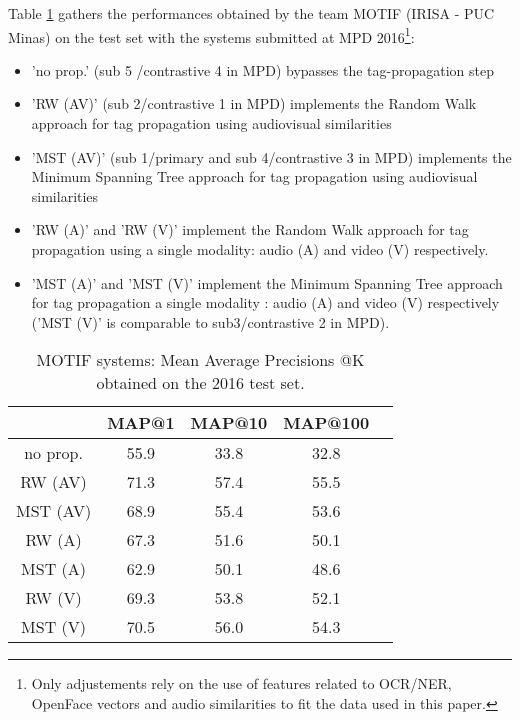 Table \ref{tab:MOTIF_perfs} gathers the performances obtained by the team MOTIF (IRISA - PUC Minas) on the test set with the systems submitted at MPD 2016\footnote{Only adjustements rely on the use of features related to OCR/NER, OpenFace vectors and audio similarities to fit the data used in this paper.}:
\begin{itemize}
  \item 'no prop.' (sub 5 /contrastive 4 in MPD) bypasses the tag-propagation step
  \item 'RW (AV)' (sub 2/contrastive 1 in MPD) implements the Random Walk approach for tag propagation using audiovisual similarities
  \item 'MST (AV)' (sub 1/primary and sub 4/contrastive 3 in MPD) implements the Minimum Spanning Tree approach for tag propagation using audiovisual similarities
  \item 'RW (A)' and  'RW (V)' implement the Random Walk approach for tag propagation using a single modality: audio (A) and video (V) respectively.
  \item 'MST (A)' and  'MST (V)' implement the Minimum Spanning Tree approach for tag propagation a single modality : audio (A) and video (V) respectively ('MST (V)' is comparable to sub3/contrastive 2 in MPD).
\end{itemize}

\begin{table}[!t]
\caption{MOTIF systems: Mean Average Precisions @K obtained on the 2016 test set.}

\label{tab:MOTIF_perfs}
\centering
\begin{tabular}{|c||c|c|c|c|}
\hline
           & MAP@1& MAP@10& MAP@100  \\ \hline
\hline
\hline
no prop.   & 55.9 &  33.8 & 32.8\\ \hline
\hline
RW (AV)    & 71.3 &  57.4 & 55.5\\ \hline
MST (AV)   & 68.9 &  55.4 & 53.6\\ \hline
\hline
RW (A)     & 67.3 &  51.6 & 50.1\\ \hline
MST (A)    & 62.9 &  50.1 & 48.6 \\ \hline
\hline
RW (V)     & 69.3  & 53.8 & 52.1 \\ \hline
MST (V)    & 70.5  & 56.0 & 54.3 \\ \hline


\end{tabular}
\end{table}

\endinput